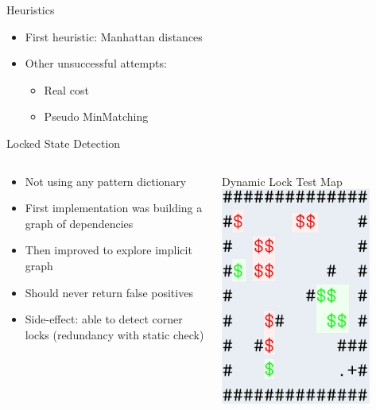 \documentclass{beamer}
\begin{document}
\begin{frame}{Heuristics}
  \begin{itemize}
    \item First heuristic: Manhattan distances
    \item Other unsuccessful attempts:
    \begin{itemize}
      \item Real cost
      \item Pseudo MinMatching
    \end{itemize}
  \end{itemize}
\end{frame}


\begin{frame}{Locked State Detection}
  \begin{columns}
    \begin{column}{.5\textwidth}
      \begin{itemize}
        \item Not using any pattern dictionary
        \item First implementation was building a graph of dependencies
        \item Then improved to explore implicit graph
        \item Should never return false positives
        \item Side-effect: able to detect corner locks (redundancy with static check)
      \end{itemize}
    \end{column}
    \begin{column}{.5\textwidth}
      \begin{block}{Dynamic Lock Test Map}
        \centering
        \includegraphics[width=0.8\textwidth]{dynamic.jpg}

\end{block}
\end{column}
\end{columns}
\end{frame}
\end{document}
